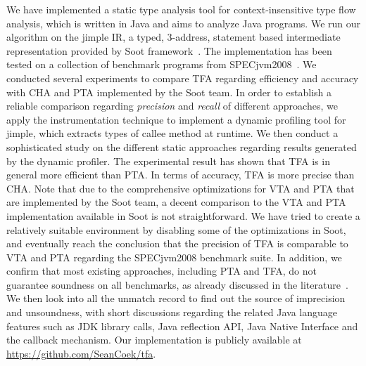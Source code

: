 \documentclass{fac}
\begin{document}
We have implemented a static type analysis tool for context-insensitive type flow analysis, which is written in Java and aims to analyze Java programs. We run our algorithm on the jimple IR, a typed, 3-address, statement based intermediate representation provided by Soot framework~\cite{soot}. The implementation has been tested on a collection of benchmark programs from SPECjvm2008~\cite{specjvm}. We conducted several experiments to compare TFA regarding efficiency and accuracy with CHA and PTA implemented by the Soot team. In order to establish a reliable comparison regarding \emph{precision} and \emph{recall} of different approaches, we apply the instrumentation technique to implement a dynamic profiling tool for jimple, which extracts types of callee method at runtime. We then conduct a sophisticated study on the different static approaches regarding results generated by the dynamic profiler. The experimental result has shown that TFA is in general more efficient than PTA. In terms of accuracy, TFA is more precise than CHA. Note that due to the comprehensive optimizations for VTA and PTA that are implemented by the Soot team, a decent comparison to the VTA and PTA implementation available in Soot is not straightforward. We have tried to create a relatively suitable environment by disabling some of the optimizations in Soot, and eventually reach the conclusion that the precision of TFA is comparable to VTA and PTA regarding the SPECjvm2008 benchmark suite. In addition, we confirm that most existing approaches, including PTA and TFA, do not guarantee soundness on all benchmarks, as already discussed in the literature~\cite{LivshitsSSLACGKMV15}. We then look into all the unmatch record to find out the source of imprecision and unsoundness, with short discussions regarding the related Java language features such as JDK library calls, Java reflection API, Java Native Interface and the callback mechanism. %
Our implementation is publicly available at \url{https://github.com/SeanCoek/tfa}.
\end{document}

